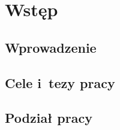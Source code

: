 \chapter{Wstęp}
\section{Wprowadzenie}

\section{Cele i~tezy pracy}

\section{Podział pracy}











